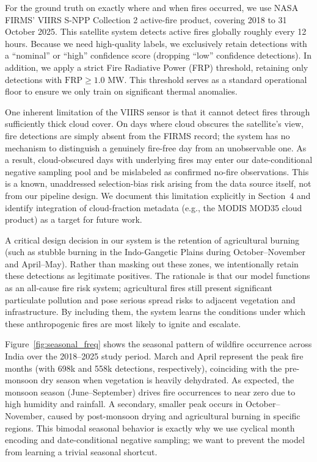 For the ground truth on exactly where and when fires occurred, we use NASA FIRMS' VIIRS S-NPP Collection 2 active-fire product, covering 2018 to 31 October 2025. This satellite system detects active fires globally roughly every 12 hours. Because we need high-quality labels, we exclusively retain detections with a ``nominal'' or ``high'' confidence score (dropping ``low'' confidence detections). In addition, we apply a strict Fire Radiative Power (FRP) threshold, retaining only detections with $\text{FRP} \ge 1.0$ MW. This threshold serves as a standard operational floor to ensure we only train on significant thermal anomalies.

One inherent limitation of the VIIRS sensor is that it cannot detect fires through sufficiently thick cloud cover. On days where cloud obscures the satellite's view, fire detections are simply absent from the FIRMS record; the system has no mechanism to distinguish a genuinely fire-free day from an unobservable one. As a result, cloud-obscured days with underlying fires may enter our date-conditional negative sampling pool and be mislabeled as confirmed no-fire observations. This is a known, unaddressed selection-bias risk arising from the data source itself, not from our pipeline design. We document this limitation explicitly in Section~4 and identify integration of cloud-fraction metadata (e.g., the MODIS MOD35 cloud product) as a target for future work.

A critical design decision in our system is the retention of agricultural burning (such as stubble burning in the Indo-Gangetic Plains during October--November and April--May). Rather than masking out these zones, we intentionally retain these detections as legitimate positives. The rationale is that our model functions as an all-cause fire risk system; agricultural fires still present significant particulate pollution and pose serious spread risks to adjacent vegetation and infrastructure. By including them, the system learns the conditions under which these anthropogenic fires are most likely to ignite and escalate.

Figure~\ref{fig:seasonal_freq} shows the seasonal pattern of wildfire occurrence across India over the 2018--2025 study period. March and April represent the peak fire months (with 698k and 558k detections, respectively), coinciding with the pre-monsoon dry season when vegetation is heavily dehydrated. As expected, the monsoon season (June--September) drives fire occurrences to near zero due to high humidity and rainfall. A secondary, smaller peak occurs in October--November, caused by post-monsoon drying and agricultural burning in specific regions. This bimodal seasonal behavior is exactly why we use cyclical month encoding and date-conditional negative sampling; we want to prevent the model from learning a trivial seasonal shortcut.


